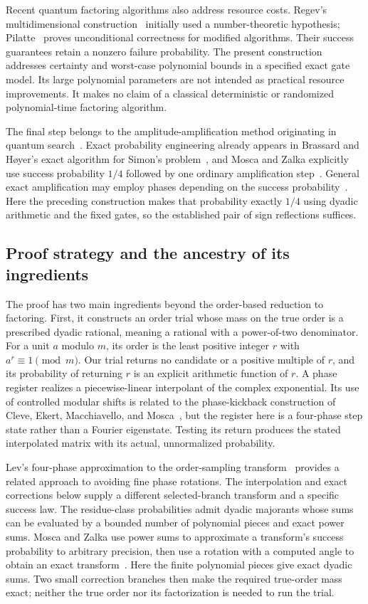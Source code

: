 Recent quantum factoring algorithms also address resource costs. Regev's
multidimensional construction~\cite{Regev} initially used a
number-theoretic hypothesis; Pilatte~\cite{Pilatte} proves unconditional
correctness for modified algorithms. Their success guarantees retain a
nonzero failure probability. The present construction addresses certainty
and worst-case polynomial bounds in a specified exact gate model. Its
large polynomial parameters are not intended as practical resource
improvements. It makes no claim of a classical deterministic or randomized
polynomial-time factoring algorithm.

The final step belongs to the amplitude-amplification method originating
in quantum search~\cite{Grover,BHMT}. Exact probability engineering already
appears in Brassard and H\o yer's exact algorithm for Simon's
problem~\cite{BH}, and Mosca and Zalka explicitly use success probability
$1/4$ followed by one ordinary amplification step~\cite[Section~2.1]{MZ}.
General exact amplification may employ phases depending on the success
probability~\cite{Hoyer,BHMT}. Here the preceding construction makes that
probability exactly $1/4$ using dyadic arithmetic and the fixed gates, so
the established pair of sign reflections suffices.

\subsection{Proof strategy and the ancestry of its ingredients}

The proof has two main ingredients beyond the order-based reduction to
factoring. First, it constructs an order trial whose mass on the true
order is a prescribed dyadic rational, meaning a rational with a
power-of-two denominator. For a unit $a$ modulo $m$, its order is the least
positive integer $r$ with $a^r\equiv1\pmod m$. Our trial returns no candidate
or a positive multiple of $r$, and its probability of returning $r$ is an
explicit arithmetic function of $r$. A phase register realizes a
piecewise-linear interpolant of the complex exponential. Its use of
controlled modular shifts is related to the phase-kickback construction
of Cleve, Ekert, Macchiavello, and Mosca~\cite[Section~7]{CEMM}, but the
register here is a four-phase step state rather than a Fourier eigenstate.
Testing its return produces the stated interpolated matrix with its
actual, unnormalized probability.

Lev's four-phase approximation to the order-sampling
transform~\cite[Sections~3--4]{Lev} provides a related approach to avoiding
fine phase rotations. The interpolation and exact
corrections below supply a different selected-branch transform and a
specific success law. The residue-class probabilities admit dyadic
majorants whose sums can be evaluated by a bounded number of polynomial
pieces and exact power sums. Mosca and Zalka use power sums to approximate
a transform's success probability to arbitrary precision, then use a
rotation with a computed angle to obtain an exact
transform~\cite[Sections~4.1--4.2]{MZ}. Here the finite polynomial pieces give
exact dyadic sums. Two small correction branches then make
the required true-order mass exact; neither the true order nor its
factorization is needed to run the trial.

